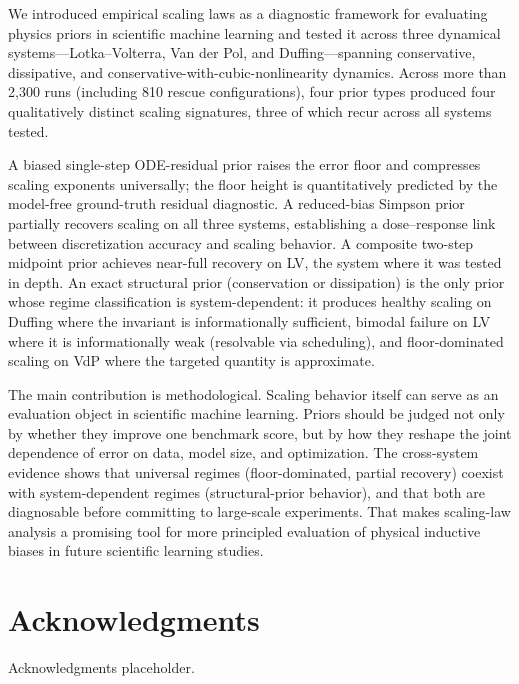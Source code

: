 \documentclass[11pt]{article}
\begin{document}
We introduced empirical scaling laws as a diagnostic framework for evaluating physics priors in scientific machine learning and tested it across three dynamical systems---Lotka--Volterra, Van der Pol, and Duffing---spanning conservative, dissipative, and conservative-with-cubic-nonlinearity dynamics.
Across more than 2{,}300 runs (including 810 rescue configurations), four prior types produced four qualitatively distinct scaling signatures, three of which recur across all systems tested.

A biased single-step ODE-residual prior raises the error floor and compresses scaling exponents universally; the floor height is quantitatively predicted by the model-free ground-truth residual diagnostic.
A reduced-bias Simpson prior partially recovers scaling on all three systems, establishing a dose--response link between discretization accuracy and scaling behavior.
A composite two-step midpoint prior achieves near-full recovery on LV, the system where it was tested in depth.
An exact structural prior (conservation or dissipation) is the only prior whose regime classification is system-dependent: it produces healthy scaling on Duffing where the invariant is informationally sufficient, bimodal failure on LV where it is informationally weak (resolvable via scheduling), and floor-dominated scaling on VdP where the targeted quantity is approximate.

The main contribution is methodological.
Scaling behavior itself can serve as an evaluation object in scientific machine learning.
Priors should be judged not only by whether they improve one benchmark score, but by how they reshape the joint dependence of error on data, model size, and optimization.
The cross-system evidence shows that universal regimes (floor-dominated, partial recovery) coexist with system-dependent regimes (structural-prior behavior), and that both are diagnosable before committing to large-scale experiments.
That makes scaling-law analysis a promising tool for more principled evaluation of physical inductive biases in future scientific learning studies.

\section*{Acknowledgments}

Acknowledgments placeholder.

\appendix
\end{document}
